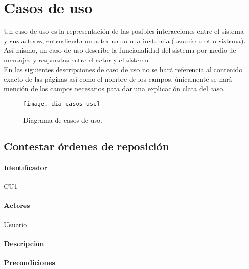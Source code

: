 
\section{Casos de uso}
Un caso de uso es la representación de las posibles interacciones entre el sistema y sus actores, entendiendo un actor como una instancia (usuario u otro sistema). Así mismo, un caso de uso describe la funcionalidad del sistema por medio de mensajes y respuestas entre el actor y el sistema\cite{ApressSE}.\\
En las siguientes descripciones de caso de uso no se hará referencia al contenido exacto de las páginas así como el nombre de los campos, únicamente se hará mención de los campos necesarios para dar una explicación clara del caso.

\begin{figure}[h]
\centering
\texttt{[image: dia-casos-uso]} 
\caption{Diagrama de casos de uso.}
\label{fig:dia-casos-uso}
\end{figure}


\subsection{Contestar órdenes de reposición}
\paragraph{Identificador}
CU1
\paragraph{Actores}
Usuario
\paragraph{Descripción}
\paragraph{Precondiciones}
